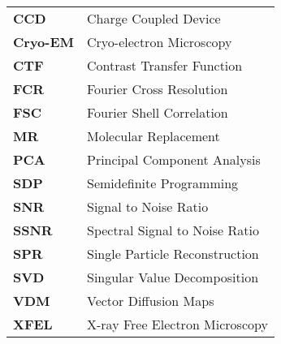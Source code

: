\begin{tabular}{ll}
\textbf{CCD} & Charge Coupled Device\\
\textbf{Cryo-EM}  & Cryo-electron Microscopy \\
\textbf{CTF} & Contrast Transfer Function \\
\textbf{FCR} & Fourier Cross Resolution \\
\textbf{FSC} & Fourier Shell Correlation \\
\textbf{MR} & Molecular Replacement \\
\textbf{PCA} & Principal Component Analysis  \\
\textbf{SDP} & Semidefinite Programming \\
\textbf{SNR} & Signal to Noise Ratio \\
\textbf{SSNR} & Spectral Signal to Noise Ratio \\
\textbf{SPR} & Single Particle Reconstruction  \\
\textbf{SVD} & Singular Value Decomposition \\
\textbf{VDM} & Vector Diffusion Maps\\
\textbf{XFEL} & X-ray Free Electron Microscopy
\end{tabular}